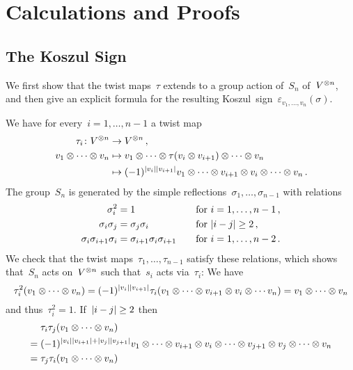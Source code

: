 \documentclass[a4paper,10pt,headings=standardclasses]{scrartcl}
\begin{document}
\section{Calculations and Proofs}


\subsection{The Koszul Sign}
\label{koszul sign proof}

We first show that the twist maps~$\tau$ extends to a group action of~$S_n$ of~$V^{\otimes n}$, and then give an explicit formula for the resulting Koszul~sign~$\varepsilon_{v_1, \dotsc, v_n}(\sigma)$.

We have for every~$i = 1, \dotsc, n-1$ a twist map
\begin{align*}
  \tau_i
  \colon
  V^{\otimes n}
  &\to
  V^{\otimes n} \,,
  \\
  v_1 \otimes \dotsb \otimes v_n
  &\mapsto
  v_1 \otimes \dotsb \otimes \tau(v_i \otimes v_{i+1}) \otimes \dotsb \otimes v_n
  \\
  &\mapsto
  (-1)^{\lvert v_i\rvert \lvert v_{i+1}\rvert}
  v_1 \otimes \dotsb \otimes v_{i+1} \otimes v_i \otimes \dotsb \otimes v_n \,.
\end{align*}
The group~$S_n$ is generated by the simple reflections~$\sigma_1, \dotsc, \sigma_{n-1}$ with relations
\begin{alignat*}{2}
  \sigma_i^2
  &=
  1
  &
  \quad
  &\text{for~$i = 1, \dotsc, n-1$} \,,
  \\
  \sigma_i \sigma_j
  &=
  \sigma_j \sigma_i
  &
  \quad
  &\text{for~$\lvert i-j\rvert \geq 2$} \,,
  \\
  \sigma_i \sigma_{i+1} \sigma_i
  &=
  \sigma_{i+1} \sigma_i \sigma_{i+1}
  &
  \quad
  &\text{for~$i = 1, \dotsc, n-2$} \,.
\end{alignat*}
We check that the twist maps~$\tau_1, \dotsc, \tau_{n-1}$ satisfy these relations, which shows that~$S_n$ acts on~$V^{\otimes n}$ such that~$s_i$ acts via~$\tau_i$:
We have
\[
  \tau_i^2(v_1 \otimes \dotsb \otimes v_n)
  =
  (-1)^{\lvert v_i\rvert \lvert v_{i+1}\rvert}
  \tau_i(v_1 \otimes \dotsb \otimes v_{i+1} \otimes v_i \otimes \dotsb v_n)
  =
  v_1 \otimes \dotsb \otimes v_n
\]
and thus~$\tau_i^2 = 1$.
If~$\lvert i-j\rvert \geq 2$ then
\begin{align*}
  {}&
  \tau_i \tau_j (v_1 \otimes \dotsb \otimes v_n)
  \\
  ={}&
  (-1)^{\lvert v_i\rvert \lvert v_{i+1}\rvert + \lvert v_j\rvert \lvert v_{j+1}\rvert}
          v_1
  \otimes \dotsb
  \otimes v_{i+1} \otimes v_i
  \otimes \dotsb
  \otimes v_{j+1} \otimes v_j
  \otimes \dotsb
  \otimes v_n
  \\
  ={}&
  \tau_j \tau_i (v_1 \otimes \dotsb \otimes v_n)
\end{align*}
\end{document}
